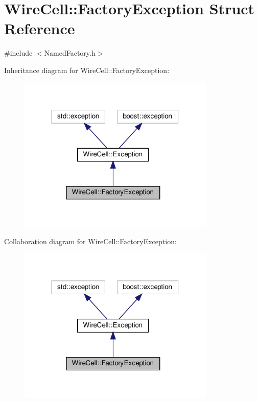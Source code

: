 \hypertarget{struct_wire_cell_1_1_factory_exception}{}\section{Wire\+Cell\+:\+:Factory\+Exception Struct Reference}
\label{struct_wire_cell_1_1_factory_exception}


{\ttfamily \#include $<$Named\+Factory.\+h$>$}



Inheritance diagram for Wire\+Cell\+:\+:Factory\+Exception\+:
\nopagebreak
\begin{figure}[H]
\begin{center}
\leavevmode
\includegraphics[width=266pt]{struct_wire_cell_1_1_factory_exception__inherit__graph}
\end{center}
\end{figure}


Collaboration diagram for Wire\+Cell\+:\+:Factory\+Exception\+:
\nopagebreak
\begin{figure}[H]
\begin{center}
\leavevmode
\includegraphics[width=266pt]{struct_wire_cell_1_1_factory_exception__coll__graph}
\end{center}
\end{figure}
